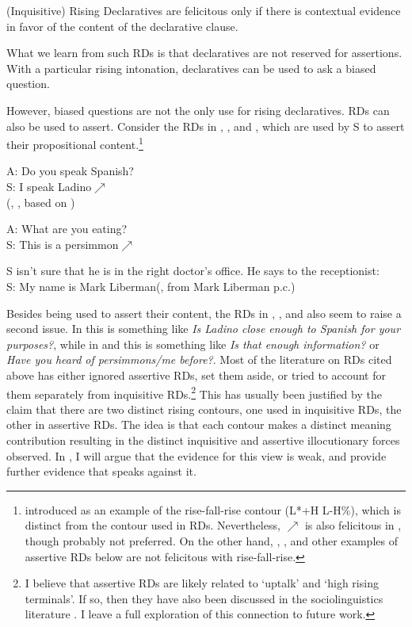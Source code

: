 \documentclass[output=paper,colorlinks,citecolor=brown]{langscibook}
\begin{document}
	\exa (Inquisitive) Rising Declaratives are felicitous only if there is contextual evidence in favor of the content of the declarative clause. \label{bias}
	\z
	
	What we learn from such RDs is that declaratives are not reserved for assertions. With a particular rising intonation, declaratives can be used to ask a biased question. 
	
	However, biased questions are not the only use for rising declaratives. RDs can also be used to assert. Consider the RDs in , , and , which are used by S to assert their propositional content.\footnote{\citet{ward85} introduced  as an example of the rise-fall-rise contour (L*+H L-H\%), which is distinct from the \rise contour used in RDs. Nevertheless, $\nearrow$ is also felicitous in , though probably not preferred. On the other hand, , , and other examples of assertive RDs below are not felicitous with rise-fall-rise.}
	
	\exa A: Do you speak Spanish?\\
	S: I speak Ladino$\nearrow$ \label{ladino} \\
	\phantom{f}\hfill (\citealt[]{jeong18}, \citealt[]{farkas17}, based on \citealt[]{ward85})
	\z
	
	\exa A: What are you eating?\\
	S: This is a persimmon$\nearrow$ \label{persimmon} 
	\z
	
	\exa S isn't sure that he is in the right doctor's office. He says to the receptionist:\\
	S: My name is Mark Liberman\rise \label{mark}\hfill (\citealt[62]{pierrehumbert80}, from Mark Liberman p.c.)
	\z
	
	Besides being used to assert their content, the RDs in , , and  also seem to raise a second issue. In  this is something like \textit{Is Ladino close enough to Spanish for your purposes?}, while in  and  this is something like \textit{Is that enough information?} or \textit{Have you heard of persimmons/me before?}. Most of the literature on RDs cited above has either ignored assertive RDs, set them aside, or tried to account for them separately from inquisitive RDs.\footnote{I believe that assertive RDs are likely related to `uptalk' and `high rising terminals'. If so, then they have also been discussed in the sociolinguistics literature \citep[e.g.][a.o.]{mclemore91, fletcher05, ladd08, shokeir08}. I leave a full exploration of this connection to future work.} This  has usually been justified by the claim that there  are two distinct rising contours, one used in inquisitive RDs, the other in assertive RDs. The idea is that each contour makes a distinct meaning contribution resulting in the distinct inquisitive and assertive illocutionary forces observed. In , I will argue that the evidence for this view is weak, and provide further evidence that speaks against it. 
	
\end{document}
